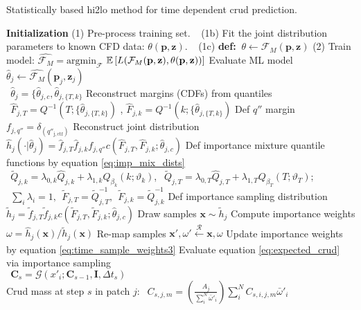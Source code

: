 \begin{algorithm}[H]
    \caption{Statistically based hi2lo method for time dependent crud prediction.}
    \begin{algorithmic}[1]
        \STATE \textbf{Initialization}
        \STATE (1) Pre-process training set.
        \STATE $\ \ $   (1b) Fit the joint distribution parameters to known CFD data: $\theta(\mathbf p, \mathbf z)$.
        \STATE $\ \ $   (1c) \textbf{def:}  $\ \theta \leftarrow \mathcal F_M(\mathbf p, \mathbf z)$
        \STATE (2) Train model:  $\hat{\mathcal F_M} =  \mathrm{argmin}_{\mathcal F}$
        $\operatorname*{\mathbb{E}} \left[ L(\mathcal{F}_M (\mathbf p, \mathbf z), \theta(\mathbf p, \mathbf z)) \right] $
          \STATE Evaluate ML model $\hat \theta_j \leftarrow \hat{\mathcal F_M}(\mathbf p_j, \mathbf z_j)$ \\
          $\ \ \hat \theta_j = \{\hat \theta_{j,c}, \hat \theta_{j,\{T,k\} }$
          \STATE Reconstruct margins (CDFs) from quantiles  \\
          $\ \ \hat F_{j,T}= Q^{-1}(T; \{\hat{\theta}_{j,\{T,k\} })$ , $\hat F_{j,k}= Q^{-1}(k; \{\hat{\theta}_{j,\{T,k\} })$
          \STATE Def $q''$ margin  $f_{j,q''} = \delta_{(q''_\mathrm{j,ctf})}$
          \STATE Reconstruct joint distribution $\hat h_j(\cdot |\hat \theta_j) = \hat f_{j,T} \hat f_{j,k} f_{j,q''} c(\hat F_{j,T}, \hat F_{j,k}; \hat \theta_{j,c})$ \;
        \ENDFOR
            \STATE Def importance  mixture quantile functions by equation \ref{eq:imp_mix_dists} \\
                $\ \ \tilde Q_{j,k} = \lambda_{0,k} \hat Q_{j,k}  + \lambda_{1,k} Q_{\beta_k}(k; \vartheta_k)$,
                $\ \ \tilde Q_{j,T} = \lambda_{0,T} \hat Q_{j,T}  + \lambda_{1,T} Q_{\beta_T}(T; \vartheta_T); $ \\
                $\ \ \sum_i \lambda_i = 1, \ \ \tilde F_{j,T} = \tilde Q^{-1}_{j,T},\ \  \tilde F_{j,k} = \tilde Q^{-1}_{j,k} $
              \STATE Def importance sampling distribution $\tilde h_j = \tilde f_{j,T} \tilde f_{j,k} c(\tilde F_{j,T}, \tilde F_{j,k}; \hat \theta_{j,c}) $
              \STATE Draw samples $\mathbf x \sim \tilde h_j$ \;
              \STATE Compute importance weights $\omega = \hat h_j(\mathbf x) /  \tilde h_j(\mathbf x) $
              \STATE Re-map samples  $\mathbf x', \omega' \xleftarrow[\text{ }]{\mathcal R} \mathbf x, \omega $
              \STATE Update importance weights by equation \ref{eq:time_sample_weights3}
              \STATE Evaluate equation \ref{eq:expected_crud} via importance sampling \\
                $\ \ \mathbf C_s = \mathcal G(x'_i; \mathbf C_{s-1}, \mathbf I, \Delta t_s)$ \\
              \STATE Crud mass at step $s$ in patch $j$:
                $\ \ C_{s,j,m} = \left( \frac{A_j}{\sum_i^N \bar \omega'_i} \right) \sum_i^N C_{s,i,j,m} \bar \omega'_i$
          \ENDFOR
        \ENDFOR
        \ENDFOR
    \end{algorithmic}
    \label{algo:hi2lo_crud_algo}
\end{algorithm}

